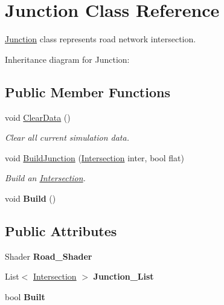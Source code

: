 \hypertarget{class_junction}{}\section{Junction Class Reference}
\label{class_junction}


\mbox{\hyperlink{class_junction}{Junction}} class represents road network intersection.  


Inheritance diagram for Junction\+:\begin{figure}[H]
\begin{center}
\leavevmode
\end{center}
\end{figure}
\subsection*{Public Member Functions}
\begin{DoxyCompactItemize}
\item 
void \mbox{\hyperlink{class_junction_a57e3c911fbcf14d45b861fcce0d717aa}{Clear\+Data}} ()
\begin{DoxyCompactList}\small\item\em Clear all current simulation data. \end{DoxyCompactList}\item 
void \mbox{\hyperlink{class_junction_ac628e043d2e35c8323d819f26dc3e0f8}{Build\+Junction}} (\mbox{\hyperlink{struct_intersection}{Intersection}} inter, bool flat)
\begin{DoxyCompactList}\small\item\em Build an \mbox{\hyperlink{struct_intersection}{Intersection}}. \end{DoxyCompactList}\item 
\mbox{\label{class_junction_a8fa76c252910d5fb58192c91ed7a16f8}} 
void {\bfseries Build} ()
\end{DoxyCompactItemize}
\subsection*{Public Attributes}
\begin{DoxyCompactItemize}
\item 
\mbox{\label{class_junction_a743d19d85f9339788d583823e1d5560d}} 
Shader {\bfseries Road\+\_\+\+Shader}
\item 
\mbox{\label{class_junction_a9bae80cbbf75fd7f785165894ecf3d1e}} 
List$<$ \mbox{\hyperlink{struct_intersection}{Intersection}} $>$ {\bfseries Junction\+\_\+\+List}
\item 
\mbox{\label{class_junction_af3ca7b1f5b4d5a1a212ec4ec5f85e842}} 
bool {\bfseries Built}
\end{DoxyCompactItemize}


